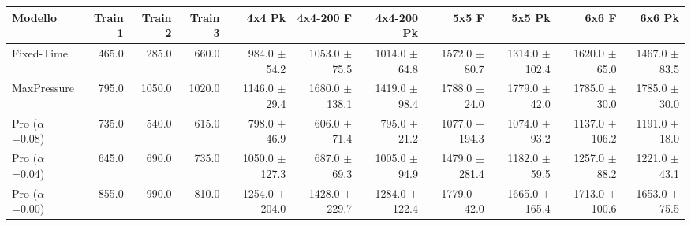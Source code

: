 \begin{table}
  \centering
  \tiny
  \begin{tabular}{@{}lrrrrrrrrrr@{}}
    \toprule
    Modello                   & Train 1 & Train 2 & Train 3 & 4x4 Pk                                        & 4x4-200 F                                     & 4x4-200 Pk                                    & 5x5 F                                         & 5x5 Pk                                        & 6x6 F                                         & 6x6 Pk                                        \\
    \midrule
    Fixed-Time                & 465.0   & 285.0   & 660.0   & 984.0 {\fontsize{4}{4}\selectfont$\pm$54.2}   & 1053.0 {\fontsize{4}{4}\selectfont$\pm$75.5}  & 1014.0 {\fontsize{4}{4}\selectfont$\pm$64.8}  & 1572.0 {\fontsize{4}{4}\selectfont$\pm$80.7}  & 1314.0 {\fontsize{4}{4}\selectfont$\pm$102.4} & 1620.0 {\fontsize{4}{4}\selectfont$\pm$65.0}  & 1467.0 {\fontsize{4}{4}\selectfont$\pm$83.5}  \\
    MaxPressure               & 795.0   & 1050.0  & 1020.0  & 1146.0 {\fontsize{4}{4}\selectfont$\pm$29.4}  & 1680.0 {\fontsize{4}{4}\selectfont$\pm$138.1} & 1419.0 {\fontsize{4}{4}\selectfont$\pm$98.4}  & 1788.0 {\fontsize{4}{4}\selectfont$\pm$24.0}  & 1779.0 {\fontsize{4}{4}\selectfont$\pm$42.0}  & 1785.0 {\fontsize{4}{4}\selectfont$\pm$30.0}  & 1785.0 {\fontsize{4}{4}\selectfont$\pm$30.0}  \\
    Pro ($\alpha$=0.08)       & 735.0   & 540.0   & 615.0   & 798.0 {\fontsize{4}{4}\selectfont$\pm$46.9}   & 606.0 {\fontsize{4}{4}\selectfont$\pm$71.4}   & 795.0 {\fontsize{4}{4}\selectfont$\pm$21.2}   & 1077.0 {\fontsize{4}{4}\selectfont$\pm$194.3} & 1074.0 {\fontsize{4}{4}\selectfont$\pm$93.2}  & 1137.0 {\fontsize{4}{4}\selectfont$\pm$106.2} & 1191.0 {\fontsize{4}{4}\selectfont$\pm$18.0}  \\
    Pro ($\alpha$=0.04)       & 645.0   & 690.0   & 735.0   & 1050.0 {\fontsize{4}{4}\selectfont$\pm$127.3} & 687.0 {\fontsize{4}{4}\selectfont$\pm$69.3}   & 1005.0 {\fontsize{4}{4}\selectfont$\pm$94.9}  & 1479.0 {\fontsize{4}{4}\selectfont$\pm$281.4} & 1182.0 {\fontsize{4}{4}\selectfont$\pm$59.5}  & 1257.0 {\fontsize{4}{4}\selectfont$\pm$88.2}  & 1221.0 {\fontsize{4}{4}\selectfont$\pm$43.1}  \\
    Pro ($\alpha$=0.00)       & 855.0   & 990.0   & 810.0   & 1254.0 {\fontsize{4}{4}\selectfont$\pm$204.0} & 1428.0 {\fontsize{4}{4}\selectfont$\pm$229.7} & 1284.0 {\fontsize{4}{4}\selectfont$\pm$122.4} & 1779.0 {\fontsize{4}{4}\selectfont$\pm$42.0}  & 1665.0 {\fontsize{4}{4}\selectfont$\pm$165.4} & 1713.0 {\fontsize{4}{4}\selectfont$\pm$100.6} & 1653.0 {\fontsize{4}{4}\selectfont$\pm$75.5}  \\

\end{tabular}
\end{table}
